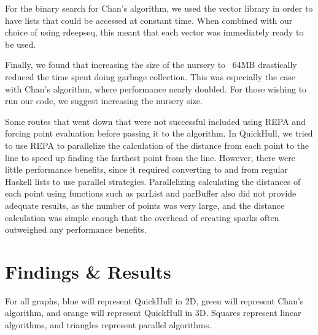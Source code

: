 \documentclass[12pt]{article}
\begin{document}
    For the binary search for Chan’s algorithm, we used the vector library in order to have lists that could be accessed at constant time. When combined with our choice of using rdeepseq, this meant that each vector was immediately ready to be used.

    Finally, we found that increasing the size of the nursery to ~64MB drastically reduced the time spent doing garbage collection. This was especially the case with Chan’s algorithm, where performance nearly doubled. For those wishing to run our code, we suggest increasing the nursery size.

    Some routes that went down that were not successful included using REPA and forcing point evaluation before passing it to the algorithm. In QuickHull, we tried to use REPA to parallelize the calculation of the distance from each point to the line to speed up finding the farthest point from the line. However, there were little performance benefits, since it required converting to and from regular Haskell lists to use parallel strategies. Parallelizing calculating the distances of each point using functions such as parList and parBuffer also did not provide adequate results, as the number of points was very large, and the distance calculation was simple enough that the overhead of creating sparks often outweighed any performance benefits.

  \section{Findings \& Results}

    For all graphs, blue will represent QuickHull in 2D, green will represent Chan's algorithm, and orange will represent QuickHull in 3D. Squares represent linear algorithms, and triangles represent parallel algorithms.
\end{document}
